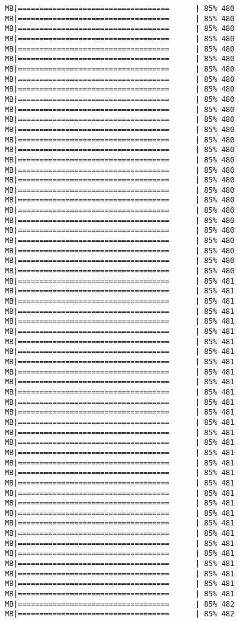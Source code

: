\documentclass[
]{article}
\begin{document}
\begin{verbatim}
MB|===================================      | 85% 480 MB|===================================      | 85% 480 MB|===================================      | 85% 480 MB|===================================      | 85% 480 MB|===================================      | 85% 480 MB|===================================      | 85% 480 MB|===================================      | 85% 480 MB|===================================      | 85% 480 MB|===================================      | 85% 480 MB|===================================      | 85% 480 MB|===================================      | 85% 480 MB|===================================      | 85% 480 MB|===================================      | 85% 480 MB|===================================      | 85% 480 MB|===================================      | 85% 480 MB|===================================      | 85% 480 MB|===================================      | 85% 480 MB|===================================      | 85% 480 MB|===================================      | 85% 480 MB|===================================      | 85% 480 MB|===================================      | 85% 480 MB|===================================      | 85% 480 MB|===================================      | 85% 480 MB|===================================      | 85% 480 MB|===================================      | 85% 480 MB|===================================      | 85% 480 MB|===================================      | 85% 480 MB|===================================      | 85% 481 MB|===================================      | 85% 481 MB|===================================      | 85% 481 MB|===================================      | 85% 481 MB|===================================      | 85% 481 MB|===================================      | 85% 481 MB|===================================      | 85% 481 MB|===================================      | 85% 481 MB|===================================      | 85% 481 MB|===================================      | 85% 481 MB|===================================      | 85% 481 MB|===================================      | 85% 481 MB|===================================      | 85% 481 MB|===================================      | 85% 481 MB|===================================      | 85% 481 MB|===================================      | 85% 481 MB|===================================      | 85% 481 MB|===================================      | 85% 481 MB|===================================      | 85% 481 MB|===================================      | 85% 481 MB|===================================      | 85% 481 MB|===================================      | 85% 481 MB|===================================      | 85% 481 MB|===================================      | 85% 481 MB|===================================      | 85% 481 MB|===================================      | 85% 481 MB|===================================      | 85% 481 MB|===================================      | 85% 481 MB|===================================      | 85% 481 MB|===================================      | 85% 481 MB|===================================      | 85% 481 MB|===================================      | 85% 481 MB|===================================      | 85% 482 MB|===================================      | 85% 482 
\end{verbatim}
\end{document}
